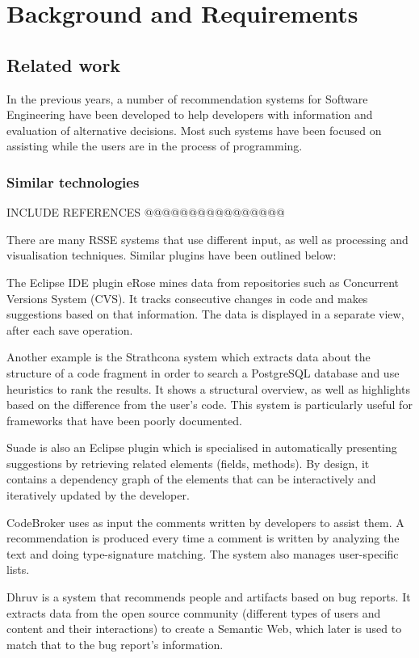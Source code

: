 \documentclass{l4proj}
\begin{document}
\chapter{Background and Requirements}

\section{Related work}

In the previous years, a number of recommendation systems for Software Engineering have been developed to help developers with information and evaluation of alternative decisions. Most such systems have been focused on assisting while the users are in the process of programming.

\subsection{Similar technologies}

INCLUDE REFERENCES @@@@@@@@@@@@@@@@

There are many RSSE systems that use different input, as well as processing and visualisation techniques. Similar plugins have been outlined below:

The Eclipse IDE plugin eRose mines data from repositories such as Concurrent Versions System (CVS). It tracks consecutive changes in code and makes suggestions based on that information. The data is displayed in a separate view, after each save operation.

Another example is the Strathcona system which extracts data about the structure of a code fragment in order to search a PostgreSQL database and use heuristics to rank the results. It shows a structural overview, as well as highlights based on the difference from the user's code. This system is particularly useful for frameworks that have been poorly documented.

Suade is also an Eclipse plugin which is specialised in automatically presenting suggestions by retrieving related elements (fields, methods). By design, it contains a dependency graph of the elements that can be interactively and iteratively updated by the developer.

CodeBroker uses as input the comments written by developers to assist them. A recommendation is produced every time a comment is written by analyzing the text and doing type-signature matching. The system also manages user-specific lists.

Dhruv is a system that recommends people and artifacts based on bug reports. It extracts data from the open source community (different types of users and content and their interactions) to create a Semantic Web, which later is used to match that to the bug report's information.
\end{document}
